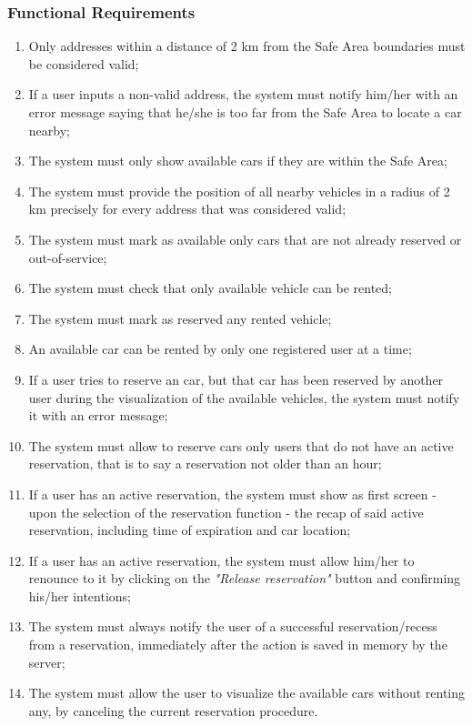 \subsubsection{Functional Requirements}
\begin{enumerate}
\item Only addresses within a distance of 2 km from the Safe Area boundaries must be considered valid;
\item If a user inputs a non-valid address, the system must notify him/her with an error message saying that he/she is too far from the Safe Area to locate a car nearby;
\item The system must only show available cars if they are within the Safe Area;
\item The system must provide the position of all nearby vehicles in a radius of 2 km precisely for every address that was considered valid;
\item The system must mark as available only cars that are not already reserved or out-of-service;
\item The system must check that only available vehicle can be rented;
\item The system must mark as reserved any rented vehicle;
\item An available car can be rented by only one registered user at a time;
\item If a user tries to reserve an car, but that car has been reserved by another user during the visualization of the available vehicles, the system must notify it with an error message;
\item The system must allow to reserve cars only users that do not have an active reservation, that is to say a reservation not older than an hour;
\item If a user has an active reservation, the system must show as first screen - upon the selection of the reservation function - the recap of said active reservation, including time of expiration and car location;
\item If a user has an active reservation, the system must allow him/her to renounce to it by clicking on the \emph{"Release reservation"} button and confirming his/her intentions;
\item The system must always notify the user of a successful reservation/recess from a reservation, immediately after the action is saved in memory by the server;
\item The system must allow the user to visualize the available cars without renting any, by canceling the current reservation procedure.
\end{enumerate}

